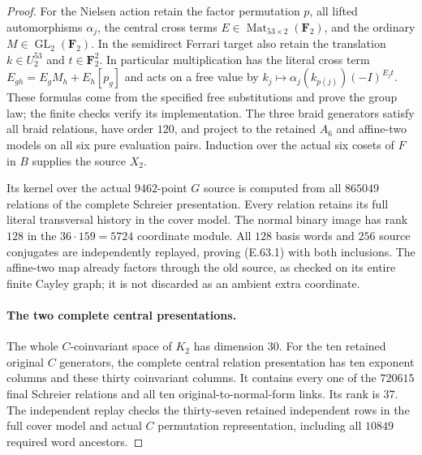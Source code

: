 \begin{proof}
For the Nielsen action retain the factor permutation
$p$, all lifted automorphisms $\alpha_j$, the central
cross terms $E\in\operatorname{Mat}_{53\times2}(\mathbf F_2)$,
and the ordinary $M\in\operatorname{GL}_2(\mathbf F_2)$.
In the semidirect Ferrari target also retain the
translation $k\in U_2^{53}$ and $t\in\mathbf F_2^2$.
In particular multiplication has the literal cross term
$E_{gh}=E_gM_h+E_h[p_g]$ and acts on a free value by
$k_j\mapsto\alpha_j(k_{p(j)})(-I)^{E_jt}$.
These formulas come from the specified free substitutions
and prove the group law; the finite checks verify its
implementation. The three braid generators satisfy all
braid relations, have order $120$, and project to the
retained $A_6$ and affine-two models on all six pure
evaluation pairs. Induction over the actual six cosets
of $F$ in $B$ supplies the source $X_2$.

Its kernel over the actual $9462$-point $G$ source is
computed from all $865049$ relations of the complete
Schreier presentation. Every relation retains its
full literal transversal history in the cover model.
The normal binary image has rank $128$ in the
$36\cdot159=5724$ coordinate module. All $128$ basis
words and $256$ source conjugates are independently
replayed, proving \textup{(E.63.1)} with both inclusions.
The affine-two map already factors through the old
source, as checked on its entire finite Cayley graph;
it is not discarded as an ambient extra coordinate.

\paragraph{The two complete central presentations.}
The whole $C$-coinvariant space of $K_2$ has dimension
$30$. For the ten retained original $C$ generators,
the complete central relation presentation has ten
exponent columns and these thirty coinvariant columns.
It contains every one of the $720615$ final Schreier
relations and all ten original-to-normal-form links.
Its rank is $37$. The independent replay checks the
thirty-seven retained independent rows in the full
cover model and actual $C$ permutation representation,
including all $10849$ required word ancestors.


\end{proof}
